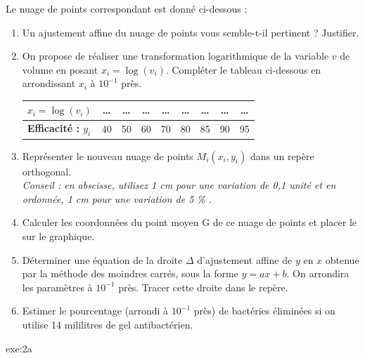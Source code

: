 {Le nuage de points correspondant est donné ci-dessous :
\begin{center}
\end{center}
\begin{enumerate}
\item Un ajustement affine du nuage de points vous semble-t-il pertinent ? Justifier.
\item On propose de réaliser une transformation logarithmique de la variable $v$ de volume en posant $x_i = \log(v_i)$.
Compléter le tableau ci-dessous en arrondissant $x_i$ à $10^{-1}$ près.
 \begin{center}
  \begin{tabular}{|l|*8{c|}}
	 \hline
	 \textbf{$x_i = \log(v_i)$} & \dots & \dots & \dots & \dots & \dots & \dots & \dots & \dots \\
	 \hline
	 \textbf{Efficacité : $y_i$} & 40 & 50 & 60 & 70 & 80 & 85 & 90 & 95 \\
	 \hline
	\end{tabular}
 \end{center}
\item Représenter le nouveau nuage de points $M_i(x_i,y_i)$ dans un repère orthogonal. \\
\textit{Conseil : en abscisse, utilisez 1 cm pour une variation de 0,1 unité et en ordonnée, 1 cm pour une variation de 5 \% .}
\item Calculer les coordonnées du point moyen G de ce nuage de points et placer le sur le graphique.
\item Déterminer une équation de la droite $\Delta$ d'ajustement affine de $y$ en $x$ obtenue par la méthode des moindres carrés,
sous la forme $y=ax+b$. On arrondira les paramètres à $10^{-1}$ près. Tracer cette droite dans le repère.
\item Estimer le pourcentage (arrondi à $10^{-1}$ près) de bactéries éliminées si on utilise 14 mililitres de gel antibactérien.
\end{enumerate}
}{exe:2a}{

}
